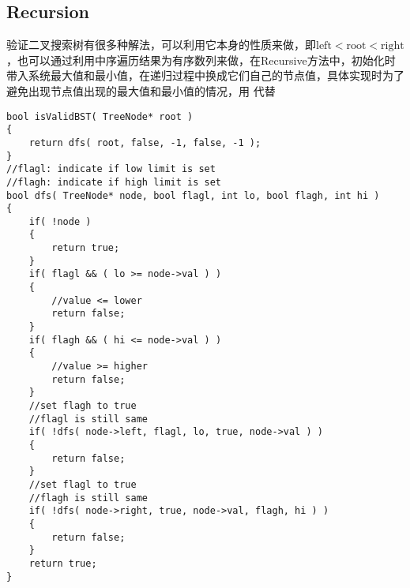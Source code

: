 \subsection{Recursion}
验证二叉搜索树有很多种解法，可以利用它本身的性质来做，即$\text{left} < \text{root} < \text{right}$，也可以通过利用中序遍历结果为有序数列来做，在Recursive方法中，初始化时带入系统最大值和最小值，在递归过程中换成它们自己的节点值，具体实现时为了避免出现节点值出现的最大值和最小值的情况，用 代替

\setcounter{lstlisting}{0}
\begin{lstlisting}[style=customc, caption={Recurision}]
bool isValidBST( TreeNode* root )
{
    return dfs( root, false, -1, false, -1 );
}
//flagl: indicate if low limit is set
//flagh: indicate if high limit is set
bool dfs( TreeNode* node, bool flagl, int lo, bool flagh, int hi )
{
    if( !node )
    {
        return true;
    }
    if( flagl && ( lo >= node->val ) )
    {
        //value <= lower
        return false;
    }
    if( flagh && ( hi <= node->val ) )
    {
        //value >= higher
        return false;
    }
    //set flagh to true
    //flagl is still same
    if( !dfs( node->left, flagl, lo, true, node->val ) )
    {
        return false;
    }
    //set flagl to true
    //flagh is still same
    if( !dfs( node->right, true, node->val, flagh, hi ) )
    {
        return false;
    }
    return true;
}
\end{lstlisting}

